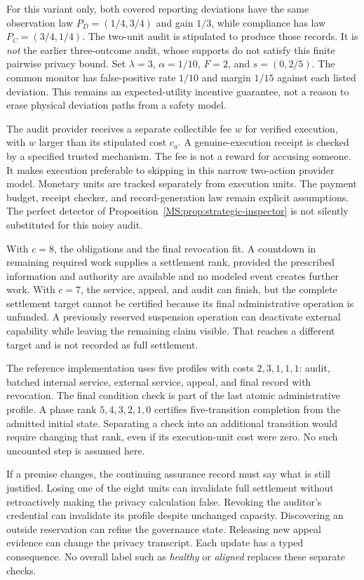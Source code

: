 For this variant only, both covered reporting deviations have the same observation law $P_D=(1/4,3/4)$ and gain $1/3$, while compliance has law $P_C=(3/4,1/4)$. The two-unit audit is stipulated to produce those records. It is \emph{not} the earlier three-outcome audit, whose supports do not satisfy this finite pairwise privacy bound. Set $\lambda=3$, $\alpha=1/10$, $F=2$, and $s=(0,2/5)$. The common monitor has false-positive rate $1/10$ and margin $1/15$ against each listed deviation. This remains an expected-utility incentive guarantee, not a reason to erase physical deviation paths from a safety model.

The audit provider receives a separate collectible fee $w$ for verified execution, with $w$ larger than its stipulated cost $c_a$. A genuine-execution receipt is checked by a specified trusted mechanism. The fee is not a reward for accusing someone. It makes execution preferable to skipping in this narrow two-action provider model. Monetary units are tracked separately from execution units. The payment budget, receipt checker, and record-generation law remain explicit assumptions. The perfect detector of Proposition~\ref{MS:prop:strategic-inspector} is not silently substituted for this noisy audit.

With $c=8$, the obligations and the final revocation fit. A countdown in remaining required work supplies a settlement rank, provided the prescribed information and authority are available and no modeled event creates further work. With $c=7$, the service, appeal, and audit can finish, but the complete settlement target cannot be certified because its final administrative operation is unfunded. A previously reserved suspension operation can deactivate external capability while leaving the remaining claim visible. That reaches a different target and is not recorded as full settlement.

The reference implementation uses five profiles with costs $2,3,1,1,1$: audit, batched internal service, external service, appeal, and final record with revocation. The final condition check is part of the last atomic administrative profile. A phase rank $5,4,3,2,1,0$ certifies five-transition completion from the admitted initial state. Separating a check into an additional transition would require changing that rank, even if its execution-unit cost were zero. No such uncounted step is assumed here.

If a premise changes, the continuing assurance record must say what is still justified. Losing one of the eight units can invalidate full settlement without retroactively making the privacy calculation false. Revoking the auditor's credential can invalidate its profile despite unchanged capacity. Discovering an outside reservation can refine the governance state. Releasing new appeal evidence can change the privacy transcript. Each update has a typed consequence. No overall label such as \emph{healthy} or \emph{aligned} replaces these separate checks.


